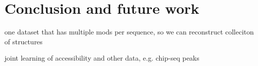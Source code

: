 \documentclass{proposal}
\begin{document}
%
%

\chapter{Conclusion and future work}

one dataset that has multiple mods per sequence, so we can reconstruct colleciton of structures

joint learning of accessibility and other data, e.g. chip-seq peaks




\end{document}
